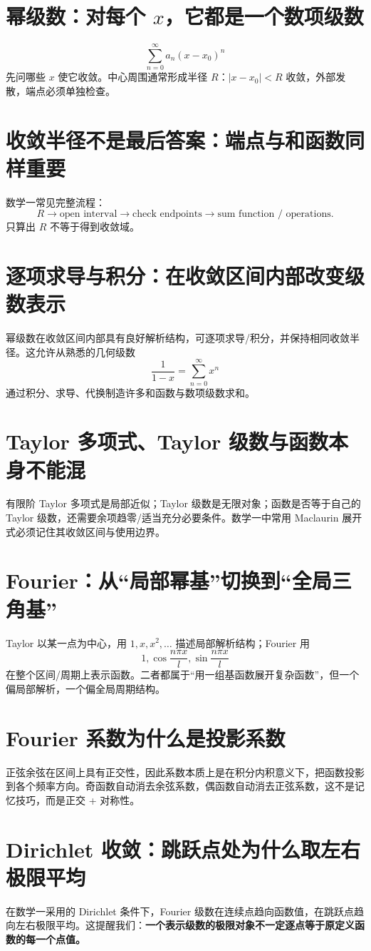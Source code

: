 \documentclass[11pt,a4paper,openany]{ctexbook}
\newcommand{\key}[1]{\textbf{\color{deep}#1}}
\begin{document}
\section{幂级数：对每个 \texorpdfstring{$x$}{x}，它都是一个数项级数}
\[
\sum_{n=0}^{\infty}a_n(x-x_0)^n
\]
先问哪些 $x$ 使它收敛。中心周围通常形成半径 $R$：$\lvert x-x_0\rvert<R$ 收敛，外部发散，端点必须单独检查。

\section{收敛半径不是最后答案：端点与和函数同样重要}
数学一常见完整流程：
\[
\boxed{R\to\text{open interval}\to\text{check endpoints}\to\text{sum function / operations}}.
\]
只算出 $R$ 不等于得到收敛域。

\section{逐项求导与积分：在收敛区间内部改变级数表示}
幂级数在收敛区间内部具有良好解析结构，可逐项求导/积分，并保持相同收敛半径。这允许从熟悉的几何级数
\[
\frac1{1-x}=\sum_{n=0}^{\infty}x^n
\]
通过积分、求导、代换制造许多和函数与数项级数求和。

\section{Taylor 多项式、Taylor 级数与函数本身不能混}
有限阶 Taylor 多项式是局部近似；Taylor 级数是无限对象；函数是否等于自己的 Taylor 级数，还需要余项趋零/适当充分必要条件。数学一中常用 Maclaurin 展开式必须记住其收敛区间与使用边界。

\section{Fourier：从“局部幂基”切换到“全局三角基”}
Taylor 以某一点为中心，用 $1,x,x^2,\dots$ 描述局部解析结构；Fourier 用
\[
1,\cos\frac{n\pi x}{l},\sin\frac{n\pi x}{l}
\]
在整个区间/周期上表示函数。二者都属于“用一组基函数展开复杂函数”，但一个偏局部解析，一个偏全局周期结构。

\section{Fourier 系数为什么是投影系数}
正弦余弦在区间上具有正交性，因此系数本质上是在积分内积意义下，把函数投影到各个频率方向。奇函数自动消去余弦系数，偶函数自动消去正弦系数，这不是记忆技巧，而是正交 + 对称性。

\section{Dirichlet 收敛：跳跃点处为什么取左右极限平均}
在数学一采用的 Dirichlet 条件下，Fourier 级数在连续点趋向函数值，在跳跃点趋向左右极限平均。这提醒我们：\key{一个表示级数的极限对象不一定逐点等于原定义函数的每一个点值。}
\end{document}

